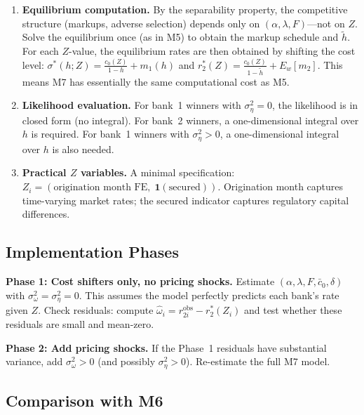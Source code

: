\documentclass[12pt]{article}
\theoremstyle{plain}
\theoremstyle{plain}
\theoremstyle{definition}  %
\theoremstyle{remark}  %
\begin{document}
\begin{enumerate}
    \item \textbf{Equilibrium computation.} By the separability property, the competitive structure (markups, adverse selection) depends only on $(\alpha, \lambda, F)$---not on $Z$. Solve the equilibrium once (as in M5) to obtain the markup schedule and $\tilde{h}$. For each $Z$-value, the equilibrium rates are then obtained by shifting the cost level: $\sigma^*(h; Z) = \frac{c_0(Z)}{1-h} + m_1(h)$ and $r_2^*(Z) = \frac{c_0(Z)}{1-\tilde{h}} + E_w[m_2]$. This means M7 has essentially the same computational cost as M5.
    
    \item \textbf{Likelihood evaluation.} For bank~1 winners with $\sigma_\eta^2 = 0$, the likelihood is in closed form (no integral). For bank~2 winners, a one-dimensional integral over $h$ is required. For bank~1 winners with $\sigma_\eta^2 > 0$, a one-dimensional integral over $h$ is also needed.
    
    \item \textbf{Practical $Z$ variables.} A minimal specification: $Z_i = (\text{origination month FE},\; \mathbf{1}(\text{secured}))$. Origination month captures time-varying market rates; the secured indicator captures regulatory capital differences.
\end{enumerate}

\subsection{Implementation Phases}

\medskip\noindent
\textbf{Phase 1: Cost shifters only, no pricing shocks.} Estimate $(\alpha, \lambda, F, \bar{c}_0, \delta)$ with $\sigma_\omega^2 = \sigma_\eta^2 = 0$. This assumes the model perfectly predicts each bank's rate given $Z$. Check residuals: compute $\hat{\omega}_i = r_{2i}^{\text{obs}} - r_2^*(Z_i)$ and test whether these residuals are small and mean-zero.

\medskip\noindent
\textbf{Phase 2: Add pricing shocks.} If the Phase~1 residuals have substantial variance, add $\sigma_\omega^2 > 0$ (and possibly $\sigma_\eta^2 > 0$). Re-estimate the full M7 model.

\subsection{Comparison with M6}
\end{document}
